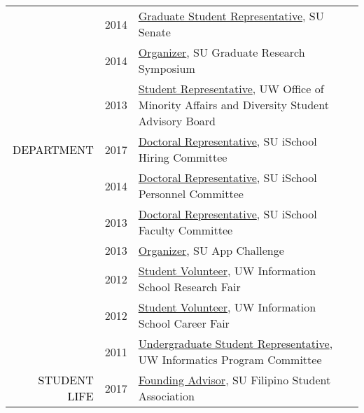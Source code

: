 \documentclass[12pt]{article}
\begin{document}
{{\begin{longtable}{Rp{1.0in}p{0.25in}p{4.75in}}
& \footnotesize{2014} & \href{http://universitysenate.syr.edu/}{{Graduate Student Representative}}, SU Senate \\

& \footnotesize{2014} & \href{https://www.facebook.com/pg/sugrads/photos/?tab=album&album_id=874022975972914}{{Organizer}}, SU Graduate Research Symposium \\

& \footnotesize{2013} & \href{https://www.washington.edu/omad/2014/05/09/no-longer-invisible-bryan-dosono/}{{Student Representative}}, UW Office of Minority Affairs and Diversity Student Advisory Board \\

\textcolor{black}{\footnotesize{\uppercase{Department}}} & \footnotesize{2017} & 
 \href{https://ischool.syr.edu/facstaff/}{{Doctoral Representative}}, SU iSchool Hiring Committee \\

& \footnotesize{2014} & \href{https://ischool.syr.edu/facstaff/}{{Doctoral Representative}}, SU iSchool Personnel Committee \\

& \footnotesize{2013} & \href{https://ischool.syr.edu/facstaff/}{{Doctoral Representative}}, SU iSchool Faculty Committee \\

& \footnotesize{2013} & \href{http://dailyorange.com/2013/12/su-app-challenge-to-announce-winners-thursday/}{{Organizer}}, SU App Challenge \\

& \footnotesize{2012} & \href{https://ischool.uw.edu/current/career-services}{{Student Volunteer}}, UW Information School Research Fair \\

& \footnotesize{2012} & \href{https://web.archive.org/web/20130104065107/https://ischool.uw.edu/news/2012/11/annual-ischool-research-fair-showcases-faculty-and-student-work}{{Student Volunteer}}, UW Information School Career Fair \\

& \footnotesize{2011} & \href{https://ischool.uw.edu/about/leadership}{{Undergraduate Student Representative}}, UW Informatics Program Committee \\

\textcolor{black}{\footnotesize{\uppercase{Student Life}}} & \footnotesize{2017} & 
 \href{https://www.facebook.com/syracusefsa/}{{Founding Advisor}}, SU Filipino Student Association \\


\end{longtable}}}
\end{document}
